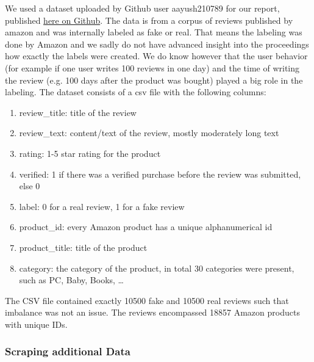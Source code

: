 \documentclass[utf8x]{ctexart}
\begin{document}
We used a dataset uploaded by Github user aayush210789 for our report, published \href{https://github.com/aayush210789/Deception-Detection-on-Amazon-reviews-dataset}{here on Github}. The data is from a corpus of reviews published by amazon and was internally labeled as fake or real. That means the labeling was done by Amazon and we sadly do not have advanced insight into the proceedings how exactly the labels were created. We do know however that the user behavior (for example if one user writes 100 reviews in one day) and the time of writing the review (e.g. 100 days after the product was bought) played a big role in the labeling.
The dataset consists of a csv file with the following columns:
\begin{enumerate}

  \item review\_title: title of the review
  \item review\_text: content/text of the review, mostly moderately long text
  \item rating: 1-5 star rating for the product
  \item verified: 1 if there was a verified purchase before the review was submitted, else 0
  \item label: 0 for a real review, 1 for a fake review
  \item product\_id: every Amazon product has a unique alphanumerical id
  \item product\_title: title of the product
  \item category: the category of the product, in total 30 categories were present, such as PC, Baby, Books, \dots

\end{enumerate}

The CSV file contained exactly 10500 fake and 10500 real reviews such that imbalance was not an issue.
The reviews encompassed 18857 Amazon products with unique IDs.

\subsubsection{Scraping additional Data}
\end{document}
